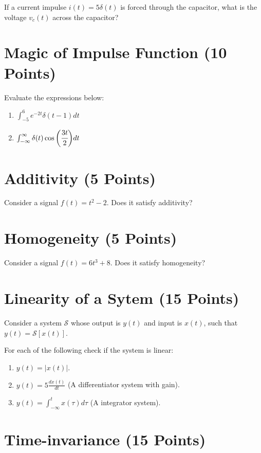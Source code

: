 \documentclass[12pt,xcolor=dvipsnames,svgnames,x11names]{article}
\begin{document}
If a current impulse $i(t) = 5\delta(t)$ is forced through the capacitor, what is the voltage $v_c(t)$ across the capacitor?

\section{Magic of Impulse Function (10 Points)}

Evaluate the expressions below:

\begin{enumerate}
\item $\int_{-5}^6 e^{-2t} \delta(t-1) dt $

\item $\int_{-\infty}^\infty \delta(t) \cos\bigg(\cfrac{3t}{2}\bigg) dt$
\end{enumerate}


\section{Additivity (5 Points)}
Consider a signal $f(t) = t^2  - 2$. Does it satisfy additivity?


\section{Homogeneity (5 Points)}
Consider a signal $f(t) = 6t^3 + 8$. Does it satisfy homogeneity?

\section{Linearity of a Sytem (15 Points)}

Consider a system $\mathcal{S}$ whose output is $y(t)$ and input is $x(t)$, such that $y(t) = \mathcal{S}[x(t)]$.

For each of the following check if the system is linear:

\begin{enumerate}
\item $y(t) = |x(t)|$.
\item $y(t) = 5 \frac{dx(t)}{dt}$ (A differentiator system with gain).
\item $y(t) = \int_{-\infty}^{t} x(\tau) d\tau$ (A integrator system).
\end{enumerate}


\section{Time-invariance (15 Points)}
\end{document}
